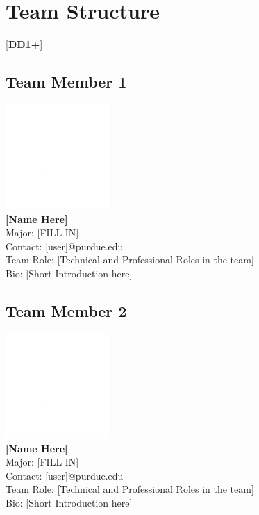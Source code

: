 
\clearpage
\section{Team Structure}
 [\textbf{DD1+}]
\subsection{Team Member 1}
\includegraphics[height=4cm]{images/white.png} \\
\textbf{[Name Here]}\\
Major: [FILL IN]\\
Contact: [user]@purdue.edu\\
Team Role: [Technical and Professional Roles in the team] \\
Bio: [Short Introduction here]

\subsection{Team Member 2}
\includegraphics[height=4cm]{images/white.png} \\
\textbf{[Name Here]}\\
Major: [FILL IN]\\
Contact: [user]@purdue.edu\\
Team Role: [Technical and Professional Roles in the team] \\
Bio: [Short Introduction here]

